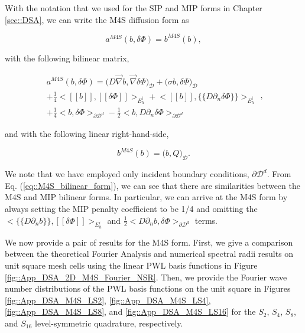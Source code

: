 With the notation that we used for the SIP and MIP forms in Chapter \ref{sec::DSA}, we can write the M4S diffusion form as 

\begin{equation}
a^{M4S}( b, \delta \Phi) = b^{M4S}(b),
\label{eq::M4S_weak_form}
\end{equation}

\noindent with the following bilinear matrix,

\begin{equation}
\label{eq::M4S_bilinear_form}
\begin{aligned}
a^{M4S}(b, \delta \Phi)  = \Big(  D \vec{\nabla} b , \vec{\nabla} \delta \Phi  \Big)_{\mathcal{D}} + \Big(  \sigma b , \delta \Phi  \Big)_{\mathcal{D}}    \\
+ \frac{1}{4}  \Big< [\![   b ]\!] , [\![  \delta \Phi ]\!]\Big>_{E_h^i} + \Big<  [\![  b ]\!] , \{\!\{  D \partial_n \delta \Phi \}\!\}\Big>_{E_h^i}   \\
+ \frac{1}{4} \Big<   b , \delta  \Phi \Big>_{\partial \mathcal{D}^d} - \frac{1}{2} \Big<  b ,  D \partial_n \delta \Phi \Big>_{\partial \mathcal{D}^d} 
\end{aligned} ,
\end{equation}

\noindent and with the following linear right-hand-side,

\begin{equation}
\label{eq::M4S_linear_form}
b^{M4S} (b) = \Big(  b, Q  \Big)_{\mathcal{D}}   .
\end{equation}

\noindent We note that we have employed only incident boundary conditions, $\partial \mathcal{D}^d$. From Eq. (\ref{eq::M4S_bilinear_form}), we can see that there are similarities between the M4S and MIP bilinear forms. In particular, we can arrive at the M4S form by always setting the MIP penalty coefficient to be 1/4 and omitting the $\Big< \{\!\{  D \partial_n b \}\!\} , [\![ \delta \Phi ]\!]\Big>_{E_h^i}$ and $\frac{1}{2} \Big<   D \partial_n b , \delta \Phi \Big>_{\partial \mathcal{D}^d}$ terms. 

We now provide a pair of results for the M4S form. First, we give a comparison between the theoretical Fourier Analysis and numerical spectral radii results on unit square mesh cells using the linear PWL basis functions in Figure \ref{fig::App_DSA_2D_M4S_Fourier_NSR}. Then, we provide the Fourier wave number distributions of the PWL basis functions on the unit square in Figures \ref{fig::App_DSA_M4S_LS2}, \ref{fig::App_DSA_M4S_LS4}, \ref{fig::App_DSA_M4S_LS8}, and \ref{fig::App_DSA_M4S_LS16} for the $S_2$, $S_4$, $S_8$, and $S_16$ level-symmetric quadrature, respectively.


